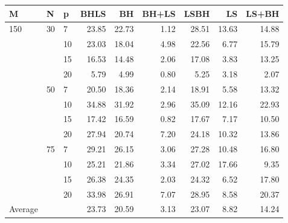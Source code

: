 \begin{center}
  \begin{tabular}{|l|l|l|rrrrrr|}
    \hline
    M & N & p & BHLS & BH & BH+LS & LSBH & LS & LS+BH \\ \hline
    150 & 30 & 7 & 23.85 & 22.73 & 1.12 & 28.51 & 13.63 & 14.88 \\
    &  & 10 & 23.03 & 18.04 & 4.98 & 22.56 & 6.77 & 15.79 \\
    &  & 15 & 16.53 & 14.48 & 2.06 & 17.08 & 3.83 & 13.25 \\
    &  & 20 & 5.79 & 4.99 & 0.80 & 5.25 & 3.18 & 2.07 \\ \cline{2-9}
    & 50 & 7 & 20.50 & 18.36 & 2.14 & 18.91 & 5.58 & 13.32 \\
    &  & 10 & 34.88 & 31.92 & 2.96 & 35.09 & 12.16 & 22.93 \\
    &  & 15 & 17.42 & 16.59 & 0.82 & 17.67 & 7.17 & 10.50 \\
    &  & 20 & 27.94 & 20.74 & 7.20 & 24.18 & 10.32 & 13.86 \\ \cline{2-9}
    & 75 & 7 & 29.21 & 26.15 & 3.06 & 27.28 & 10.48 & 16.80 \\
    &  & 10 & 25.21 & 21.86 & 3.34 & 27.02 & 17.66 & 9.35 \\
    &  & 15 & 26.38 & 24.35 & 2.03 & 24.32 & 6.52 & 17.80 \\
    &  & 20 & 33.98 & 26.91 & 7.07 & 28.95 & 8.58 & 20.37 \\ \hline
    Average &  &  & 23.73 & 20.59 & 3.13 & 23.07 & 8.82 & 14.24 \\
    \hline
  \end{tabular}
\end{center}
